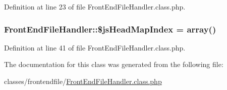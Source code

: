 Definition at line 23 of file Front\+End\+File\+Handler.\+class.\+php.

\hypertarget{classFrontEndFileHandler_a151a55b31ffaec411a86b7f618eed4ac}{}
\subsubsection[{\$js\+Head\+Map\+Index}]{\setlength{\rightskip}{0pt plus 5cm}Front\+End\+File\+Handler\+::\$js\+Head\+Map\+Index = array()}\label{classFrontEndFileHandler_a151a55b31ffaec411a86b7f618eed4ac}


Definition at line 41 of file Front\+End\+File\+Handler.\+class.\+php.



The documentation for this class was generated from the following file\+:\begin{DoxyCompactItemize}
\item 
classes/frontendfile/\hyperlink{FrontEndFileHandler_8class_8php}{Front\+End\+File\+Handler.\+class.\+php}\end{DoxyCompactItemize}
